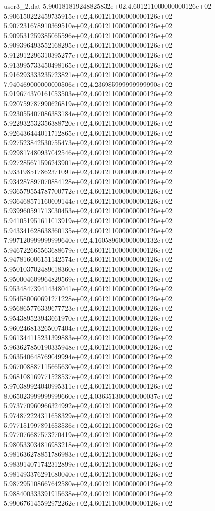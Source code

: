\begin{filecontents}{user3_2.dat}
5.900181819248825832e+02,4.601211000000000126e+02
5.906150222459735915e+02,4.601211000000000126e+02
5.907231678910369510e+02,4.601211000000000126e+02
5.909531259385065596e+02,4.601211000000000126e+02
5.909396493552168295e+02,4.601211000000000126e+02
5.912912296310395277e+02,4.601211000000000126e+02
5.913995733450498165e+02,4.601211000000000126e+02
5.916293333235723821e+02,4.601211000000000126e+02
7.940469000000000506e+02,4.236985999999999990e+02
5.919674370161053503e+02,4.601211000000000126e+02
5.920759787990626819e+02,4.601211000000000126e+02
5.923055407086383184e+02,4.601211000000000126e+02
5.922932532356388720e+02,4.601211000000000126e+02
5.926436444011712865e+02,4.601211000000000126e+02
5.927523842530755473e+02,4.601211000000000126e+02
5.929817480937042546e+02,4.601211000000000126e+02
5.927285671596243901e+02,4.601211000000000126e+02
5.933198517862371091e+02,4.601211000000000126e+02
5.934287897070884128e+02,4.601211000000000126e+02
5.936579554787700772e+02,4.601211000000000126e+02
5.936468571160609144e+02,4.601211000000000126e+02
5.939960591713030453e+02,4.601211000000000126e+02
5.941051951611013919e+02,4.601211000000000126e+02
5.943341628638360135e+02,4.601211000000000126e+02
7.997120999999999640e+02,4.160589600000000132e+02
5.946722665563688679e+02,4.601211000000000126e+02
5.947816006151142574e+02,4.601211000000000126e+02
5.950103702489018360e+02,4.601211000000000126e+02
5.950004609964829569e+02,4.601211000000000126e+02
5.953484739414348041e+02,4.601211000000000126e+02
5.954580060691271228e+02,4.601211000000000126e+02
5.956865776339677723e+02,4.601211000000000126e+02
5.954389523943661970e+02,4.601211000000000126e+02
5.960246813265007404e+02,4.601211000000000126e+02
5.961344115231399883e+02,4.601211000000000126e+02
5.963627850190335948e+02,4.601211000000000126e+02
5.963540648769049994e+02,4.601211000000000126e+02
5.967008887115665630e+02,4.601211000000000126e+02
5.968108169771528537e+02,4.601211000000000126e+02
5.970389924040995311e+02,4.601211000000000126e+02
8.065023999999999660e+02,4.036351300000000037e+02
5.973770960966324992e+02,4.601211000000000126e+02
5.974872224311658329e+02,4.601211000000000126e+02
5.977151997891653536e+02,4.601211000000000126e+02
5.977076687573270419e+02,4.601211000000000126e+02
5.980533034816983218e+02,4.601211000000000126e+02
5.981636278851786983e+02,4.601211000000000126e+02
5.983914071742312899e+02,4.601211000000000126e+02
5.981493376291080040e+02,4.601211000000000126e+02
5.987295108667642580e+02,4.601211000000000126e+02
5.988400333391915638e+02,4.601211000000000126e+02
5.990676145592972262e+02,4.601211000000000126e+02

\end{filecontents}
